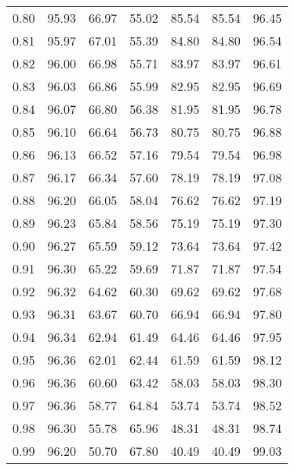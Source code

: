 \begin{tabular}{|c|c|c|c|c|c|c|}
      0.80 &     95.93 &     66.97 &      55.02 &   85.54 &      85.54 &         96.45 \\
      0.81 &     95.97 &     67.01 &      55.39 &   84.80 &      84.80 &         96.54 \\
      0.82 &     96.00 &     66.98 &      55.71 &   83.97 &      83.97 &         96.61 \\
      0.83 &     96.03 &     66.86 &      55.99 &   82.95 &      82.95 &         96.69 \\
      0.84 &     96.07 &     66.80 &      56.38 &   81.95 &      81.95 &         96.78 \\
      0.85 &     96.10 &     66.64 &      56.73 &   80.75 &      80.75 &         96.88 \\
      0.86 &     96.13 &     66.52 &      57.16 &   79.54 &      79.54 &         96.98 \\
      0.87 &     96.17 &     66.34 &      57.60 &   78.19 &      78.19 &         97.08 \\
      0.88 &     96.20 &     66.05 &      58.04 &   76.62 &      76.62 &         97.19 \\
      0.89 &     96.23 &     65.84 &      58.56 &   75.19 &      75.19 &         97.30 \\
      0.90 &     96.27 &     65.59 &      59.12 &   73.64 &      73.64 &         97.42 \\
      0.91 &     96.30 &     65.22 &      59.69 &   71.87 &      71.87 &         97.54 \\
      0.92 &     96.32 &     64.62 &      60.30 &   69.62 &      69.62 &         97.68 \\
      0.93 &     96.31 &     63.67 &      60.70 &   66.94 &      66.94 &         97.80 \\
      0.94 &     96.34 &     62.94 &      61.49 &   64.46 &      64.46 &         97.95 \\
      0.95 &     96.36 &     62.01 &      62.44 &   61.59 &      61.59 &         98.12 \\
      0.96 &     96.36 &     60.60 &      63.42 &   58.03 &      58.03 &         98.30 \\
      0.97 &     96.36 &     58.77 &      64.84 &   53.74 &      53.74 &         98.52 \\
      0.98 &     96.30 &     55.78 &      65.96 &   48.31 &      48.31 &         98.74 \\
      0.99 &     96.20 &     50.70 &      67.80 &   40.49 &      40.49 &         99.03 \\
\bottomrule
\end{tabular}
